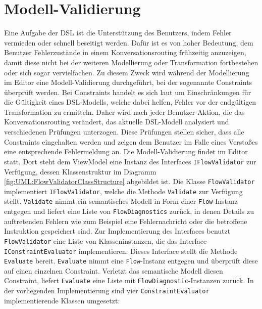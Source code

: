 \section{Modell-Validierung} 
Eine Aufgabe der DSL ist die Unterstützung des Benutzers, indem Fehler vermieden oder schnell beseitigt werden. Dafür ist es von hoher Bedeutung, dem Benutzer Fehlerzustände in einem Konversationsrouting frühzeitig anzuzeigen, damit diese nicht bei der weiteren Modellierung oder Transformation fortbestehen oder sich sogar vervielfachen. Zu diesem Zweck wird während der Modellierung im Editor eine Modell-Validierung durchgeführt, bei der sogenannte Constraints überprüft werden. Bei Constraints handelt es sich laut \cite[S. 82ff, 289ff]{Voelter:13} um Einschränkungen für die Gültigkeit eines DSL-Modells, welche dabei helfen, Fehler vor der endgültigen Transformation zu ermitteln. Daher wird nach jeder Benutzer-Aktion, die das Konversationsrouting verändert, das aktuelle DSL-Modell analysiert und verschiedenen Prüfungen unterzogen. Diese Prüfungen stellen sicher, dass alle Constraints eingehalten werden und zeigen dem Benutzer im Falle eines Verstoßes eine entsprechende Fehlermeldung an.
\newline
Die Modell-Validierung findet im Editor statt. Dort steht dem ViewModel eine Instanz des Interfaces \texttt{IFlowValidator} zur Verfügung, dessen Klassenstruktur im Diagramm \ref{fig:UML:FlowValidatorClassStructure} abgebildet ist. Die Klasse \texttt{FlowValidator} implementiert \texttt{IFlowValidator}, welche die Methode \texttt{Validate} zur Verfügung stellt. \texttt{Validate} nimmt ein semantisches Modell in Form einer \texttt{Flow}-Instanz entgegen und liefert eine Liste von \texttt{FlowDiagnostics} zurück, in denen Details zu auftretenden Fehlern wie zum Beispiel eine Fehlernachricht oder die betroffene Instruktion gespeichert sind. Zur Implementierung des Interfaces benutzt \texttt{FlowValidator} eine Liste von Klasseninstanzen, die das Interface \texttt{IConstraintEvaluator} implementieren. Dieses Interface stellt die Methode \texttt{Evaluate} bereit. \texttt{Evaluate} nimmt eine \texttt{Flow}-Instanz entgegen und überprüft diese auf einen einzelnen Constraint. Verletzt das semantische Modell diesen Constraint, liefert \texttt{Evaluate} eine Liste mit \texttt{FlowDiagnostic}-Instanzen zurück. In der vorliegenden Implementierung sind vier \texttt{ConstraintEvaluator} implementierende Klassen umgesetzt: 
